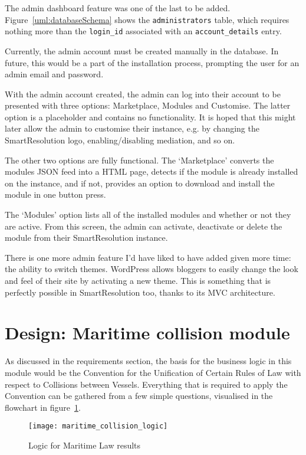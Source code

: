 The admin dashboard feature was one of the last to be added. Figure~\ref{uml:databaseSchema} shows the \lstinline{administrators} table, which requires nothing more than the \lstinline{login_id} associated with an \lstinline{account_details} entry.

Currently, the admin account must be created manually in the database. In future, this would be a part of the installation process, prompting the user for an admin email and password.

With the admin account created, the admin can log into their account to be presented with three options: Marketplace, Modules and Customise. The latter option is a placeholder and contains no functionality. It is hoped that this might later allow the admin to customise their instance, e.g. by changing the SmartResolution logo, enabling/disabling mediation, and so on.

The other two options are fully functional. The `Marketplace' converts the modules JSON feed into a HTML page, detects if the module is already installed on the instance, and if not, provides an option to download and install the module in one button press.

The `Modules' option lists all of the installed modules and whether or not they are active. From this screen, the admin can activate, deactivate or delete the module from their SmartResolution instance.

There is one more admin feature I'd have liked to have added given more time: the ability to switch themes. WordPress allows bloggers to easily change the look and feel of their site by activating a new theme. This is something that is perfectly possible in SmartResolution too, thanks to its MVC architecture.

\section{Design: Maritime collision module}

As discussed in the requirements section, the basis for the business logic in this module would be the Convention for the Unification of Certain Rules of Law with respect to Collisions between Vessels. Everything that is required to apply the Convention can be gathered from a few simple questions, visualised in the flowchart in figure~\ref{uml:maritimeLogic}.

\begin{figure}[h!]
  \centering
    \texttt{[image: maritime\_collision\_logic]}
  \caption{Logic for Maritime Law results}
  \label{uml:maritimeLogic}
\end{figure}

